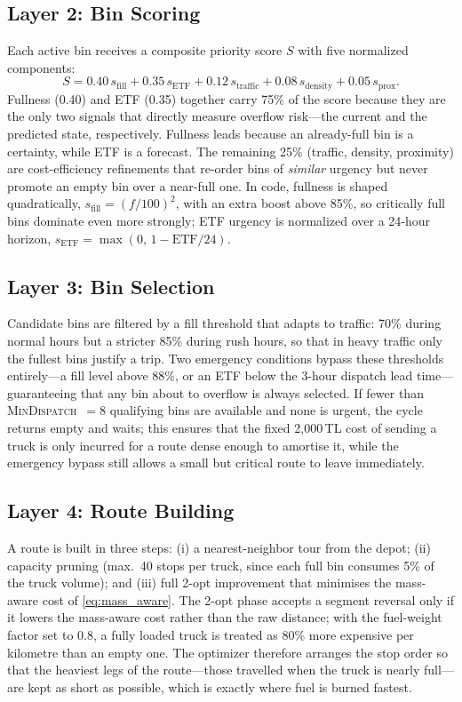 \documentclass[conference, a4paper]{IEEEtran}
\begin{document}
\subsection{Layer 2: Bin Scoring}
Each active bin receives a composite priority score $S$ with five normalized components:
\begin{equation}
  S = 0.40\,s_{\text{fill}} + 0.35\,s_{\text{ETF}} + 0.12\,s_{\text{traffic}} + 0.08\,s_{\text{density}} + 0.05\,s_{\text{prox}}.
  \label{eq:bin_score}
\end{equation}
Fullness (0.40) and ETF (0.35) together carry 75\% of the score because they are the only two signals that directly measure overflow risk---the current and the predicted state, respectively. Fullness leads because an already-full bin is a certainty, while ETF is a forecast. The remaining 25\% (traffic, density, proximity) are cost-efficiency refinements that re-order bins of \textit{similar} urgency but never promote an empty bin over a near-full one. In code, fullness is shaped quadratically, $s_{\text{fill}}=(f/100)^2$, with an extra boost above 85\%, so critically full bins dominate even more strongly; ETF urgency is normalized over a 24-hour horizon, $s_{\text{ETF}}=\max(0,\,1-\text{ETF}/24)$.

\subsection{Layer 3: Bin Selection}
Candidate bins are filtered by a fill threshold that adapts to traffic: 70\% during normal hours but a stricter 85\% during rush hours, so that in heavy traffic only the fullest bins justify a trip. Two emergency conditions bypass these thresholds entirely---a fill level above 88\%, or an ETF below the 3-hour dispatch lead time---guaranteeing that any bin about to overflow is always selected. If fewer than \textsc{MinDispatch}~$=8$ qualifying bins are available and none is urgent, the cycle returns empty and waits; this ensures that the fixed 2{,}000\,TL cost of sending a truck is only incurred for a route dense enough to amortise it, while the emergency bypass still allows a small but critical route to leave immediately.

\subsection{Layer 4: Route Building}
A route is built in three steps: (i) a nearest-neighbor tour from the depot; (ii) capacity pruning (max.\ 40 stops per truck, since each full bin consumes 5\% of the truck volume); and (iii) full 2-opt improvement that minimises the mass-aware cost of \eqref{eq:mass_aware}. The 2-opt phase accepts a segment reversal only if it lowers the mass-aware cost rather than the raw distance; with the fuel-weight factor set to 0.8, a fully loaded truck is treated as 80\% more expensive per kilometre than an empty one. The optimizer therefore arranges the stop order so that the heaviest legs of the route---those travelled when the truck is nearly full---are kept as short as possible, which is exactly where fuel is burned fastest.
\end{document}
